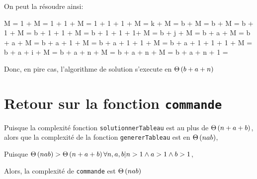\documentclass[class=article]{standalone}
\begin{document}
On peut la résoudre ainsi:
\begin{deriv}
    M
    \<= 
    1 + M
    \<= 
    1 + 1 + M
    \<= 
    1 + 1 + 1 + M
    \<= 
    k + M
    \<= 
    b + M
    \<= 
    b + M
    \<= 
    b + 1 + M
    \<= 
    b + 1 + 1 + M
    \<= 
    b + 1 + 1 + 1+ M
    \<= 
    b + j + M
    \<= 
    b + a + M
    \<= 
    b + a + M
    \<= 
    b + a + 1 + M
    \<= 
    b + a + 1  + 1 + M
    \<= 
    b + a + 1 + 1 + 1 + M
    \<= 
    b + a + i + M
    \<= 
    b + a + n + M
    \<= 
    b + a + n + M
    \<= 
    b + a + n + 1
    \<\in
    \Theta{}
    \<=
    \Theta{}
\end{deriv}


Donc, en pire cas, l'algorithme de solution s'execute en $\Theta\left ( b + a + n \right )$

\section*{Retour sur la fonction \lstinline{commande}}

Puisque la complexité fonction \lstinline{solutionnerTableau} 
est au plus de $\Theta\left ( n + a + b \right )$, alors que la complexité 
de la fonction \lstinline{genererTableau} est en $\Theta\left ( nab \right )$,

Puisque $\Theta\left ( nab \right ) > \Theta\left ( n + a + b \right )
\forall n, a, b | n > 1 \wedge a > 1 \wedge b > 1$,

Alors, la complexité de \lstinline{commande} est $\Theta\left ( nab \right )$
\end{document}
